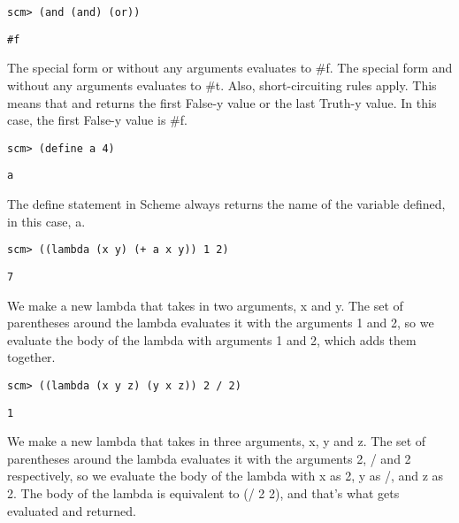 \begin{blocksection}
\begin{lstlisting}
scm> (and (and) (or))
\end{lstlisting}
\begin{solution}[0.25in]
\begin{lstlisting}
#f
\end{lstlisting}
The special form or without any arguments evaluates to \#f. The special form and without any arguments evaluates to \#t. Also, short-circuiting rules apply. This means that and returns the first False-y value or the last Truth-y value. In this case, the first False-y value is \#f. 
\end{solution}

\begin{lstlisting}
scm> (define a 4)
\end{lstlisting}
\begin{solution}[0.25in]
\begin{lstlisting}
a
\end{lstlisting}
The define statement in Scheme always returns the name of the variable defined, in this case, a.
\end{solution}

\begin{lstlisting}
scm> ((lambda (x y) (+ a x y)) 1 2)
\end{lstlisting}
\begin{solution}[0.25in]
\begin{lstlisting}
7
\end{lstlisting}
We make a new lambda that takes in two arguments, x and y. The set of parentheses around the lambda evaluates it with the arguments 1 and 2, so we evaluate the body of the lambda with arguments 1 and 2, which adds them together.
\end{solution}

\begin{lstlisting}
scm> ((lambda (x y z) (y x z)) 2 / 2)
\end{lstlisting}
\begin{solution}[0.25in]
\begin{lstlisting}
1
\end{lstlisting}
We make a new lambda that takes in three arguments, x, y and z. The set of parentheses around the lambda evaluates it with the arguments 2, / and 2 respectively, so we evaluate the body of the lambda with x as 2, y as /, and z as 2. The body of the lambda is equivalent to (/ 2 2), and that’s what gets evaluated and returned.
\end{solution}
\end{blocksection}
